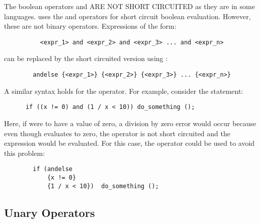    The boolean operators  and  ARE NOT SHORT CIRCUITED as they are
   in some languages.  \slang{} uses the  and  operators for
   short circuit boolean evaluation.  However, these are not binary
   operators. Expressions of the form:
\begin{verbatim}
          <expr_1> and <expr_2> and <expr_3> ... and <expr_n>
\end{verbatim}
   can be replaced by the short circuited version using :
\begin{verbatim}
        andelse {<expr_1>} {<expr_2>} {<expr_3>} ... {<expr_n>}
\end{verbatim}
   A similar syntax holds for the  operator.  For example, consider
   the statement: 
\begin{verbatim}
      if ((x != 0) and (1 / x < 10)) do_something ();
\end{verbatim}
   Here, if  were to have a value of zero, a division by zero error
   would occur because even though  evaluates to zero, the
    operator is not short circuited and the  expression
   would be evaluated. For this case, the  operator could be
   used to avoid this problem:
\begin{verbatim}
        if (andelse
            {x != 0}
            {1 / x < 10})  do_something ();
\end{verbatim}

\subsection{Unary Operators}


